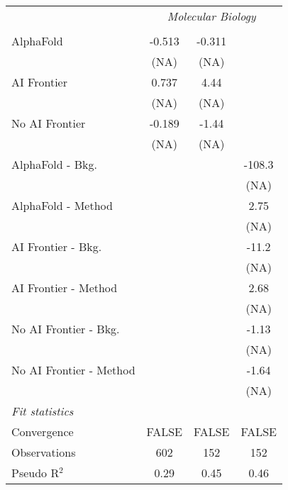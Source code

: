 \begin{tabular}{lccc}
 & \multicolumn{3}{c}{\textit{Molecular Biology}} \\ \\
   AlphaFold               & -0.513 & -0.311 &   \\   
                           & (NA)   & (NA)   &   \\   
   AI Frontier             & 0.737  & 4.44   &   \\   
                           & (NA)   & (NA)   &   \\   
   No AI Frontier          & -0.189 & -1.44  &   \\   
                           & (NA)   & (NA)   &   \\   
   AlphaFold - Bkg.        &        &        & -108.3\\   
                           &        &        & (NA)\\   
   AlphaFold - Method      &        &        & 2.75\\   
                           &        &        & (NA)\\   
   AI Frontier - Bkg.      &        &        & -11.2\\   
                           &        &        & (NA)\\   
   AI Frontier - Method    &        &        & 2.68\\   
                           &        &        & (NA)\\   
   No AI Frontier - Bkg.   &        &        & -1.13\\   
                           &        &        & (NA)\\   
   No AI Frontier - Method &        &        & -1.64\\   
                           &        &        & (NA)\\   
   \midrule
   \emph{Fit statistics}\\
   Convergence             &FALSE   & FALSE  & FALSE\\  
   Observations            & 602    & 152    & 152\\  
   Pseudo R$^2$            & 0.29   & 0.45   & 0.46\\  
   

\end{tabular}
